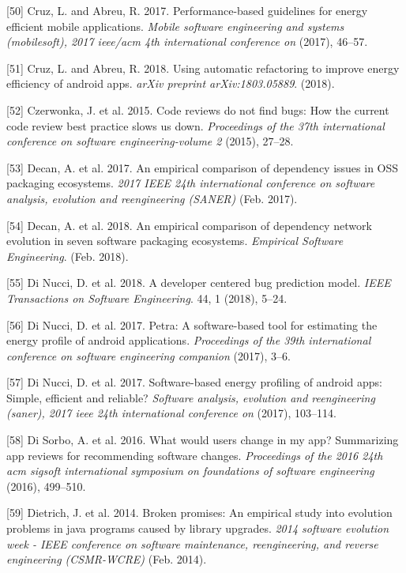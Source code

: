 \documentclass[]{book}
\begin{document}
\hypertarget{ref-CA2017}{}
{[}50{]} Cruz, L. and Abreu, R. 2017. Performance-based guidelines for
energy efficient mobile applications. \emph{Mobile software engineering
and systems (mobilesoft), 2017 ieee/acm 4th international conference on}
(2017), 46--57.

\hypertarget{ref-CA2018}{}
{[}51{]} Cruz, L. and Abreu, R. 2018. Using automatic refactoring to
improve energy efficiency of android apps. \emph{arXiv preprint
arXiv:1803.05889}. (2018).

\hypertarget{ref-czerwonka2015code}{}
{[}52{]} Czerwonka, J. et al. 2015. Code reviews do not find bugs: How
the current code review best practice slows us down. \emph{Proceedings
of the 37th international conference on software engineering-volume 2}
(2015), 27--28.

\hypertarget{ref-Decan2017}{}
{[}53{]} Decan, A. et al. 2017. An empirical comparison of dependency
issues in OSS packaging ecosystems. \emph{2017 IEEE 24th international
conference on software analysis, evolution and reengineering (SANER)}
(Feb. 2017).

\hypertarget{ref-Decan2018}{}
{[}54{]} Decan, A. et al. 2018. An empirical comparison of dependency
network evolution in seven software packaging ecosystems.
\emph{Empirical Software Engineering}. (Feb. 2018).

\hypertarget{ref-DiNucci2018}{}
{[}55{]} Di Nucci, D. et al. 2018. A developer centered bug prediction
model. \emph{IEEE Transactions on Software Engineering}. 44, 1 (2018),
5--24.

\hypertarget{ref-NPPPZL2017B}{}
{[}56{]} Di Nucci, D. et al. 2017. Petra: A software-based tool for
estimating the energy profile of android applications. \emph{Proceedings
of the 39th international conference on software engineering companion}
(2017), 3--6.

\hypertarget{ref-NPPPZL2017}{}
{[}57{]} Di Nucci, D. et al. 2017. Software-based energy profiling of
android apps: Simple, efficient and reliable? \emph{Software analysis,
evolution and reengineering (saner), 2017 ieee 24th international
conference on} (2017), 103--114.

\hypertarget{ref-di2016would}{}
{[}58{]} Di Sorbo, A. et al. 2016. What would users change in my app?
Summarizing app reviews for recommending software changes.
\emph{Proceedings of the 2016 24th acm sigsoft international symposium
on foundations of software engineering} (2016), 499--510.

\hypertarget{ref-Dietrich2014}{}
{[}59{]} Dietrich, J. et al. 2014. Broken promises: An empirical study
into evolution problems in java programs caused by library upgrades.
\emph{2014 software evolution week - IEEE conference on software
maintenance, reengineering, and reverse engineering (CSMR-WCRE)} (Feb.
2014).
\end{document}
